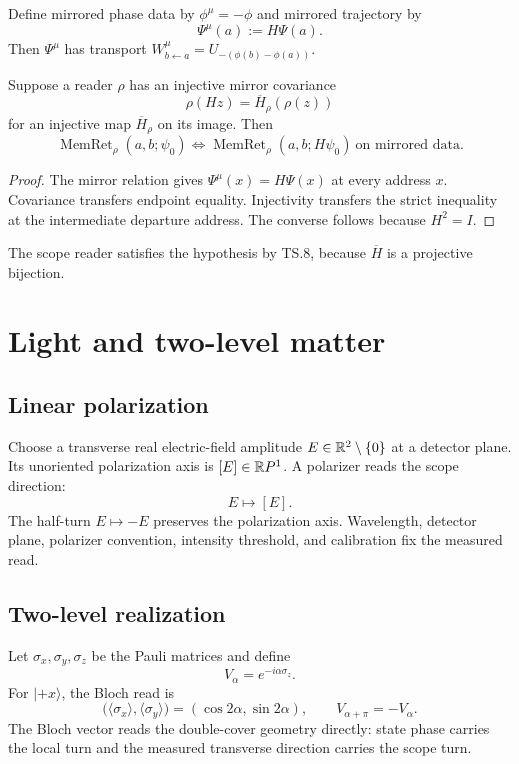 \documentclass[10pt]{article}
\begin{document}
Define mirrored phase data by $\phi^\mu=-\phi$ and mirrored trajectory by
\[
\Psi^\mu(a):=H\Psi(a).
\tag{TS.17}
\]
Then $\Psi^\mu$ has transport
$W^\mu_{b\leftarrow a}=U_{-(\phi(b)-\phi(a))}$.

\begin{theorem}
Suppose a reader $\rho$ has an injective mirror covariance
\[
\rho(Hz)=\overline H_\rho(\rho(z))
\tag{TS.18}
\]
for an injective map $\overline H_\rho$ on its image. Then
\[
\operatorname{MemRet}_{\rho}(a,b;\psi_0)
\Longleftrightarrow
\operatorname{MemRet}_{\rho}(a,b;H\psi_0)\ \text{on mirrored data}.
\tag{TS.19}
\]
\end{theorem}

\begin{proof}
The mirror relation gives $\Psi^\mu(x)=H\Psi(x)$ at every address $x$.
Covariance transfers endpoint equality. Injectivity transfers the strict
inequality at the intermediate departure address. The converse follows
because $H^2=I$.
\end{proof}

The scope reader satisfies the hypothesis by TS.8, because $\overline H$ is
a projective bijection.

\section{Light and two-level matter}

\subsection{Linear polarization}

Choose a transverse real electric-field amplitude $E\in\mathbb R^2\setminus\{0\}$
at a detector plane. Its unoriented polarization axis is $[E]\in
\mathbb R P^1$. A polarizer reads the scope direction:
\[
E\longmapsto [E].
\tag{TS.20}
\]
The half-turn $E\mapsto-E$ preserves the polarization axis. Wavelength,
detector plane, polarizer convention, intensity threshold, and calibration
fix the measured read.

\subsection{Two-level realization}

Let $\sigma_x,\sigma_y,\sigma_z$ be the Pauli matrices and define
\[
V_\alpha=e^{-i\alpha\sigma_z}.
\tag{TS.21}
\]
For $|+x\rangle$, the Bloch read is
\[
\bigl(\langle\sigma_x\rangle,\langle\sigma_y\rangle\bigr)
=(\cos2\alpha,\sin2\alpha),
\qquad V_{\alpha+\pi}=-V_\alpha.
\tag{TS.22}
\]
The Bloch vector reads the double-cover geometry directly: state phase carries
the local turn and the measured transverse direction carries the scope turn.
\end{document}
